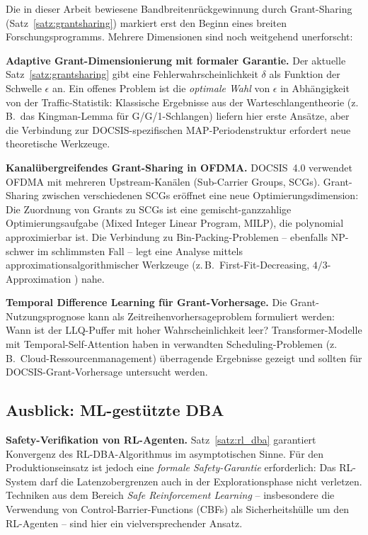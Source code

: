 ﻿\documentclass[a4paper,12pt]{article}
\theoremstyle{definition}
\begin{document}
Die in dieser Arbeit bewiesene Bandbreitenr\"{u}ckgewinnung durch Grant-Sharing
(Satz~\ref{satz:grantsharing}) markiert erst den Beginn eines breiten
Forschungsprogramms. Mehrere Dimensionen sind noch weitgehend unerforscht:

\textbf{Adaptive Grant-Dimensionierung mit formaler Garantie.}
Der aktuelle Satz~\ref{satz:grantsharing} gibt eine Fehlerwahrscheinlichkeit
$\delta$ als Funktion der Schwelle $\epsilon$ an. Ein offenes Problem ist die
\emph{optimale Wahl} von $\epsilon$ in Abh\"{a}ngigkeit von der Traffic-Statistik:
Klassische Ergebnisse aus der Warteschlangentheorie (z.\,B.\ das Kingman-Lemma
f\"{u}r G/G/1-Schlangen) liefern hier erste Ans\"{a}tze, aber die Verbindung zur
DOCSIS-spezifischen MAP-Periodenstruktur erfordert neue theoretische Werkzeuge.

\textbf{Kanalübergreifendes Grant-Sharing in OFDMA.}
DOCSIS~4.0 verwendet OFDMA mit mehreren Upstream-Kan\"{a}len (Sub-Carrier Groups,
SCGs). Grant-Sharing zwischen verschiedenen SCGs er\"{o}ffnet eine neue
Optimierungsdimension: Die Zuordnung von Grants zu SCGs ist eine gemischt-ganzzahlige
Optimierungsaufgabe (Mixed Integer Linear Program, MILP), die polynomial
approximierbar ist. Die Verbindung zu Bin-Packing-Problemen -- ebenfalls
NP-schwer im schlimmsten Fall -- legt eine Analyse mittels
approximationsalgorithmischer Werkzeuge (z.\,B.\ First-Fit-Decreasing,
$4/3$-Approximation \cite{garey1979computers}) nahe.

\textbf{Temporal Difference Learning f\"{u}r Grant-Vorhersage.}
Die Grant-Nutzungsprognose kann als Zeitreihenvorhersageproblem formuliert
werden: Wann ist der LLQ-Puffer mit hoher Wahrscheinlichkeit leer?
Transformer-Modelle mit Temporal-Self-Attention haben in verwandten
Scheduling-Problemen (z.\,B.\ Cloud-Ressourcenmanagement) \"{u}berragende Ergebnisse
gezeigt und sollten f\"{u}r DOCSIS-Grant-Vorhersage untersucht werden.

\subsection{Ausblick: ML-gest\"{u}tzte DBA}

\textbf{Safety-Verifikation von RL-Agenten.}
Satz~\ref{satz:rl_dba} garantiert Konvergenz des RL-DBA-Algorithmus im
asymptotischen Sinne. F\"{u}r den Produktionseinsatz ist jedoch eine \emph{formale
Safety-Garantie} erforderlich: Das RL-System darf die Latenzobergrenzen auch
in der Explorationsphase nicht verletzen. Techniken aus dem Bereich
\emph{Safe Reinforcement Learning} -- insbesondere die Verwendung von
Control-Barrier-Functions (CBFs) als Sicherheitshülle um den RL-Agenten --
sind hier ein vielversprechender Ansatz.
\end{document}
